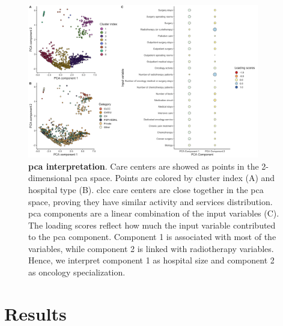 \begin{figure}[H]
    \includegraphics[width=0.9\textwidth]{images/camion/supplemental/sup_fig1_pca_and_clustering.png}
    \centering
    \caption{ \textbf{\ac{pca} interpretation}. Care centers are showed as
        points in the 2-dimensional \ac{pca} space. Points are colored by
        cluster index (A) and hospital type (B). \ac{clcc} care centers are
        close together in the \ac{pca} space, proving they have similar activity
        and services distribution. \ac{pca} components are a linear combination
        of the input variables (C). The loading scores reflect how much the
        input variable contributed to the \ac{pca} component. Component 1 is
        associated with most of the variables, while component 2 is linked with
        radiotherapy variables. Hence, we interpret component 1 as hospital size
        and component 2 as oncology specialization. }
    \label{fig:clustering-pca}
\end{figure}

\section{Results}


